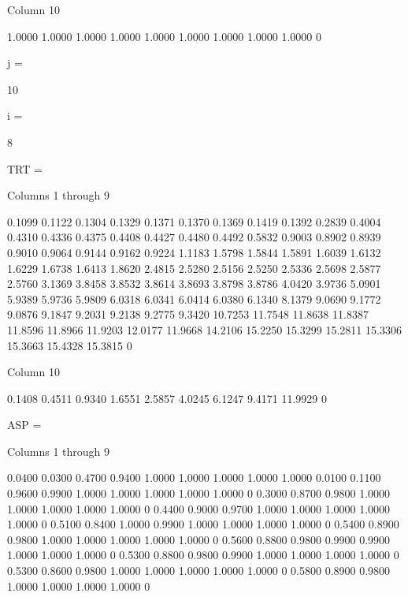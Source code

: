   Column 10

    1.0000
    1.0000
    1.0000
    1.0000
    1.0000
    1.0000
    1.0000
    1.0000
    1.0000
         0


j =

    10


i =

     8


TRT =

  Columns 1 through 9

    0.1099    0.1122    0.1304    0.1329    0.1371    0.1370    0.1369    0.1419    0.1392
    0.2839    0.4004    0.4310    0.4336    0.4375    0.4408    0.4427    0.4480    0.4492
    0.5832    0.9003    0.8902    0.8939    0.9010    0.9064    0.9144    0.9162    0.9224
    1.1183    1.5798    1.5844    1.5891    1.6039    1.6132    1.6229    1.6738    1.6413
    1.8620    2.4815    2.5280    2.5156    2.5250    2.5336    2.5698    2.5877    2.5760
    3.1369    3.8458    3.8532    3.8614    3.8693    3.8798    3.8786    4.0420    3.9736
    5.0901    5.9389    5.9736    5.9809    6.0318    6.0341    6.0414    6.0380    6.1340
    8.1379    9.0690    9.1772    9.0876    9.1847    9.2031    9.2138    9.2775    9.3420
   10.7253   11.7548   11.8638   11.8387   11.8596   11.8966   11.9203   12.0177   11.9668
   14.2106   15.2250   15.3299   15.2811   15.3306   15.3663   15.4328   15.3815         0

  Column 10

    0.1408
    0.4511
    0.9340
    1.6551
    2.5857
    4.0245
    6.1247
    9.4171
   11.9929
         0


ASP =

  Columns 1 through 9

    0.0400    0.0300    0.4700    0.9400    1.0000    1.0000    1.0000    1.0000    1.0000
    0.0100    0.1100    0.9600    0.9900    1.0000    1.0000    1.0000    1.0000    1.0000
         0    0.3000    0.8700    0.9800    1.0000    1.0000    1.0000    1.0000    1.0000
         0    0.4400    0.9000    0.9700    1.0000    1.0000    1.0000    1.0000    1.0000
         0    0.5100    0.8400    1.0000    0.9900    1.0000    1.0000    1.0000    1.0000
         0    0.5400    0.8900    0.9800    1.0000    1.0000    1.0000    1.0000    1.0000
         0    0.5600    0.8800    0.9800    0.9900    0.9900    1.0000    1.0000    1.0000
         0    0.5300    0.8800    0.9800    0.9900    1.0000    1.0000    1.0000    1.0000
         0    0.5300    0.8600    0.9800    1.0000    1.0000    1.0000    1.0000    1.0000
         0    0.5800    0.8900    0.9800    1.0000    1.0000    1.0000    1.0000         0

